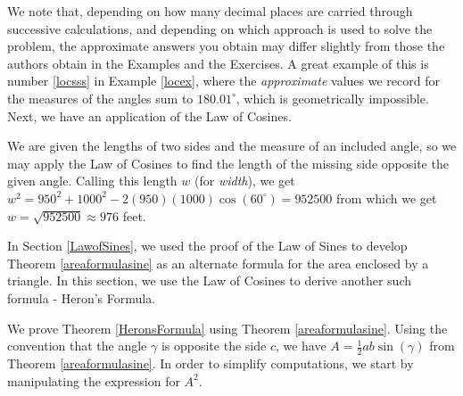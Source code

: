 \medskip

We note that, depending on how many decimal places are carried through successive calculations, and depending on which approach is used to solve the problem, the approximate answers you obtain may differ slightly from those the authors obtain in the Examples and the Exercises.  A great example of this is number   \ref{locsss} in  Example \ref{locex}, where the \textit{approximate} values we record for the measures of the angles sum to $180.01^{\circ}$, which is geometrically impossible. Next, we have an application of the Law of Cosines.

\medskip

{We are given the lengths of two sides and the measure of an included angle, so we may apply the Law of Cosines to find the length of the missing side opposite the given angle.  Calling this length $w$ (for \textit{width}), we get  $w^2 = 950^2 + 1000^2 - 2(950)(1000)\cos\left(60^{\circ}\right) = 952500$ from which we get $w = \sqrt{952500} \approx 976$ feet.  }

\medskip

In Section \ref{LawofSines}, we used the proof of the Law of Sines to develop Theorem \ref{areaformulasine} as an alternate formula for the area enclosed by a triangle.  In this section, we use the Law of Cosines to derive another such formula - Heron's Formula.

\smallskip


\smallskip

We prove Theorem \ref{HeronsFormula} using Theorem \ref{areaformulasine}.  Using the convention that the angle $\gamma$ is opposite the side $c$,  we have $A = \frac{1}{2} ab \sin(\gamma)$ from Theorem \ref{areaformulasine}.  In order to simplify computations, we start by manipulating the expression for $A^2$.



